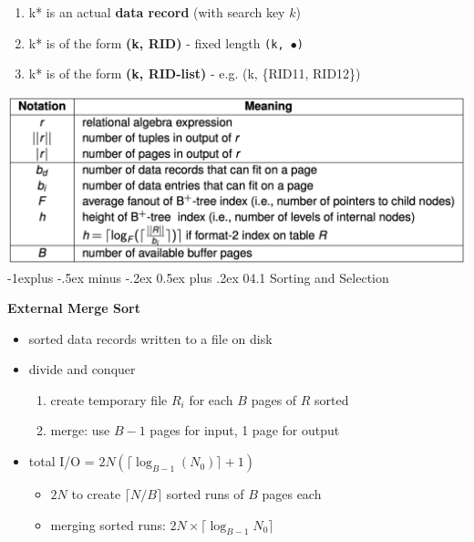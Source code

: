 \documentclass[8pt, landscape]{extarticle}
\makeatletter
\renewcommand{\subsection}{\@startsection{subsection}{2}{0mm}%
  {-1explus -.5ex minus -.2ex}%
  {0.5ex plus .2ex}%
{\normalfont\normalsize\bfseries}}
\makeatother
\begin{document}
\raggedright
\footnotesize
\begin{multicols*}{4}
  \setlength{\columnseprule}{0.25pt}

  \begin{center}
  \end{center}
  
  \begin{enumerate}
    \item k* is an actual \textbf{data record} (with search key $k$) 
    \item k* is of the form \textbf{(k, RID)} - fixed length \texttt{(k, \textbf{$\bullet$})}
    \item k* is of the form \textbf{(k, RID-list)} - e.g. (k, \{RID11, RID12\})
  \end{enumerate}

  \includegraphics[width=0.95\linewidth]{cs3223-notation.png} 
  \subsection{04.1 Sorting and Selection}

  \textbf{External Merge Sort}

  \begin{itemize}
    \item {} sorted data records written to a file on disk
    \item divide and conquer
      \begin{enumerate}
        \item create temporary file $R_i$ for each $B$ pages of $R$ sorted
        \item merge: use $B-1$ pages for input, 1 page for output
      \end{enumerate}
    \item total I/O = $2N(\lceil \log_{B-1}(N_0) \rceil +1)$
      \begin{itemize}
        \item $2N$ to create $\lceil N/B \rceil $ sorted runs of $B$ pages each
        \item merging sorted runs: $2N \times \lceil \log_{B-1}N_0 \rceil $
      \end{itemize}
  \end{itemize}


\end{multicols*}
\end{document}
